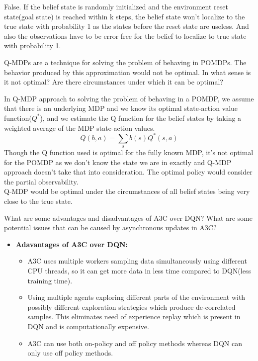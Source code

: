 \documentclass[solution,addpoints,12pt]{exam}
\begin{document}
\begin{questions}
\begin{solution}
False. If the belief state is randomly initialized and the environment reset state(goal state) is reached within k steps, the belief state won't localize to the true state with probability 1 as the states before the reset state are useless. And also the observations have to be error free for the belief to localize to true state with probability 1.  
\end{solution}

\question[3]
Q-MDPs are a technique for solving the problem of behaving in POMDPs. The behavior produced by this approximation would not be optimal. In what sense is it not optimal?  Are there circumstances under which it can be optimal?

\begin{solution}
In Q-MDP approach to solving the problem of behaving in a POMDP, we assume that there is an underlying MDP and we know its optimal state-action value function($Q^{*}$), and we estimate the Q function for the belief states by taking a weighted average of the MDP state-action values.
\begin{equation}
 Q(b, a) = \sum_{s} b(s) Q^{*}(s, a)
\end{equation}
Though the Q function used is optimal for the fully known MDP, it's not optimal for the POMDP as we don't know the state we are in exactly and Q-MDP approach doesn't take that into consideration. The optimal policy would consider the partial observability.\\
Q-MDP would be optimal under the circumstances of all belief states being very close to the true state.
\end{solution}

\question[3] What are some advantages and disadvantages of A3C over DQN? What are some potential issues that can be caused by asynchronous updates in A3C?

\begin{solution}
\begin{itemize}
 \item \textbf{Adavantages of A3C over DQN:}
    \begin{itemize}
     \item A3C uses multiple workers sampling data simultaneously using different CPU threads, so it can get more data in less time compared to DQN(less training time).
     \item Using multiple agents exploring different parts of the environment with possibly different exploration strategies which produce de-correlated samples. This eliminates need of experience replay which is present in DQN and is computationally expensive.
     \item A3C can use both on-policy and off policy methods whereas DQN can only use off policy methods.
    \end{itemize} 
\end{itemize}


\end{solution}
\end{questions}
\end{document}
